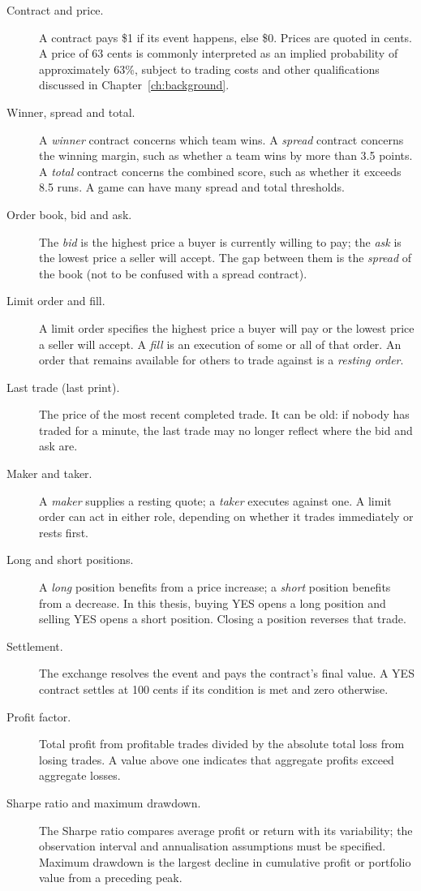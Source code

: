 \documentclass[12pt,a4paper,oneside]{report}
\begin{document}
\begin{description}
  \item[Contract and price.] A contract pays \$1 if its event happens, else \$0.
        Prices are quoted in cents. A price of 63 cents is commonly interpreted
        as an implied probability of approximately 63\%, subject to trading
        costs and other qualifications discussed in Chapter~\ref{ch:background}.
  \item[Winner, spread and total.] A \emph{winner} contract concerns which
        team wins. A \emph{spread} contract concerns the winning margin,
        such as whether a team wins by more than 3.5 points. A \emph{total}
        contract concerns the combined score, such as whether it exceeds
        8.5 runs. A game can have many spread and total thresholds.
  \item[Order book, bid and ask.] The \emph{bid} is the highest price a buyer is
        currently willing to pay; the \emph{ask} is the lowest price a seller
        will accept. The gap between them is the \emph{spread} of the book
        (not to be confused with a spread contract).
  \item[Limit order and fill.] A limit order specifies the highest price a
        buyer will pay or the lowest price a seller will accept. A \emph{fill}
        is an execution of some or all of that order. An order that remains
        available for others to trade against is a \emph{resting order}.
  \item[Last trade (last print).] The price of the most recent completed trade.
        It can be old: if nobody has traded for a minute, the last trade may no
        longer reflect where the bid and ask are.
  \item[Maker and taker.] A \emph{maker} supplies a resting quote; a
        \emph{taker} executes against one. A limit order can act in either
        role, depending on whether it trades immediately or rests first.
  \item[Long and short positions.] A \emph{long} position benefits from a
        price increase; a \emph{short} position benefits from a decrease.
        In this thesis, buying YES opens a long position and selling YES
        opens a short position. Closing a position reverses that trade.
  \item[Settlement.] The exchange resolves the event and pays the contract's
        final value. A YES contract settles at 100 cents if its condition is
        met and zero otherwise.
  \item[Profit factor.] Total profit from profitable trades divided by the
        absolute total loss from losing trades. A value above one indicates
        that aggregate profits exceed aggregate losses.
  \item[Sharpe ratio and maximum drawdown.] The Sharpe ratio compares average
        profit or return with its variability; the observation interval and
        annualisation assumptions must be specified. Maximum drawdown is the
        largest decline in cumulative profit or portfolio value from a
        preceding peak.
\end{description}
\end{document}
